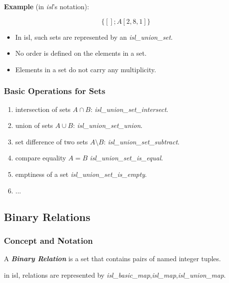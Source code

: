 \textbf{Example} (in \emph{isl}'s notation):

$$\{[];A[2,8,1]\}$$

\begin{itemize}
  \item In isl, such sets are represented by an \textcolor{pg}{\emph{isl\_union\_set}}.
  \item No order is defined on the elements in a set.
  \item Elements in a set do not carry any multiplicity.
\end{itemize}

\subsubsection{Basic Operations for Sets}

\begin{enumerate}
  \item intersection of sets $A \cap B$: \textcolor{pg}{\emph{isl\_union\_set\_intersect}}.
  \item union of sets $A \cup B$: \textcolor{pg}{\emph{isl\_union\_set\_union}}.
  \item set difference of two sets $A \setminus B$: \textcolor{pg}{\emph{isl\_union\_set\_subtract}}.
  \item compare equality $A = B$ \textcolor{pg}{\emph{isl\_union\_set\_is\_equal}}.
  \item emptiness of a set \textcolor{pg}{\emph{isl\_union\_set\_is\_empty}}.
  \item ...
\end{enumerate}

\subsection{Binary Relations}

\subsubsection{Concept and Notation}

\textcolor{vr}{A \textbf{\emph{Binary Relation}} is a set that contains pairs of named integer tuples.}

in isl, relations are represented by  \textcolor{pg}{\emph{isl\_basic\_map}},\textcolor{pg}{\emph{isl\_map}},\textcolor{pg}{\emph{isl\_union\_map}}.

